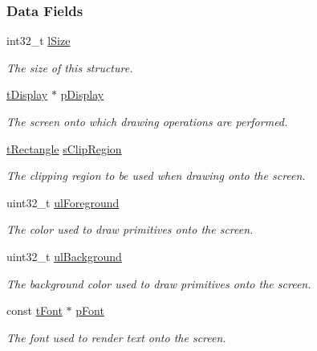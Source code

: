 \subsubsection*{Data Fields}
\begin{DoxyCompactItemize}
\item 
int32\+\_\+t \hyperlink{structt_context_a799968a6a85d60435e563b41673771bb}{l\+Size}
\begin{DoxyCompactList}\small\item\em The size of this structure. \end{DoxyCompactList}\item 
\hyperlink{structt_display}{t\+Display} $\ast$ \hyperlink{structt_context_a98adcde3d5648a0b60525fdd1b5484d7}{p\+Display}
\begin{DoxyCompactList}\small\item\em The screen onto which drawing operations are performed. \end{DoxyCompactList}\item 
\hyperlink{structt_rectangle}{t\+Rectangle} \hyperlink{structt_context_af2001db845ff3005adff3b745b1fdf4b}{s\+Clip\+Region}
\begin{DoxyCompactList}\small\item\em The clipping region to be used when drawing onto the screen. \end{DoxyCompactList}\item 
uint32\+\_\+t \hyperlink{structt_context_ac1ed552aa3a7402a1d6acf69947304aa}{ul\+Foreground}
\begin{DoxyCompactList}\small\item\em The color used to draw primitives onto the screen. \end{DoxyCompactList}\item 
uint32\+\_\+t \hyperlink{structt_context_ab10941c8887fb09b2d909c21f2f16390}{ul\+Background}
\begin{DoxyCompactList}\small\item\em The background color used to draw primitives onto the screen. \end{DoxyCompactList}\item 
const \hyperlink{structt_font}{t\+Font} $\ast$ \hyperlink{structt_context_affa1b2961910a9716369945476ae89fe}{p\+Font}
\begin{DoxyCompactList}\small\item\em The font used to render text onto the screen. \end{DoxyCompactList}\end{DoxyCompactItemize}



